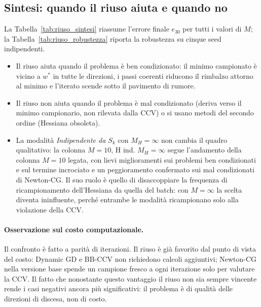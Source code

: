 \subsection{Sintesi: quando il riuso aiuta e quando no}\label{app:riuso-sintesi}

La Tabella~\ref{tab:riuso_sintesi} riassume l'errore finale $e_{30}$ per tutti
i valori di $M$; la Tabella~\ref{tab:riuso_robustezza} riporta la robustezza
su cinque seed indipendenti.

\begin{itemize}
\item Il riuso aiuta quando il problema è ben condizionato: il minimo
  campionato è vicino a $w^*$ in tutte le direzioni, i passi coerenti riducono
  il rimbalzo attorno al minimo e l'iterato scende sotto il pavimento di
  rumore.
\item Il riuso non aiuta quando il problema è mal condizionato
  (deriva verso il minimo campionario, non rilevata dalla CCV) o si usano
  metodi del secondo ordine (Hessiana obsoleta).
\item La modalità \emph{Indipendente da $S_k$} con $M_H=\infty$ non cambia il
  quadro qualitativo: la colonna $M{=}10$, H ind. $M_H{=}\infty$ segue
  l'andamento della colonna $M{=}10$ legata, con lievi miglioramenti sui
  problemi ben condizionati e sul termine incrociato e un peggioramento
  confermato sui mal condizionati di Newton-CG. Il suo ruolo è quello di
  disaccoppiare la frequenza di ricampionamento dell'Hessiana da quella del
  batch: con $M=\infty$ la scelta diventa ininfluente, perché entrambe le
  modalità ricampionano solo alla violazione della CCV.
\end{itemize}

\paragraph{Osservazione sul costo computazionale.}
Il confronto è fatto a parità di iterazioni. Il riuso è già favorito dal
punto di vista del costo: Dynamic GD e BB-CCV non richiedono calcoli
aggiuntivi; Newton-CG nella versione base spende un campione fresco a ogni
iterazione solo per valutare la CCV. Il fatto che nonostante questo vantaggio
il riuso non sia sempre vincente rende i casi negativi ancora più significativi:
il problema è di qualità delle direzioni di discesa, non di costo.


